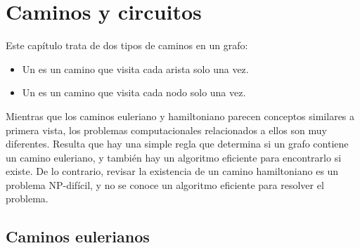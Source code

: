 \chapter{Caminos y circuitos}

Este capítulo trata de dos tipos de caminos en un grafo:
\begin{itemize}
    \item Un  es un camino que visita cada arista
          solo una vez.
    \item Un  es un camino que visita cada nodo
          solo una vez.
\end{itemize}

Mientras que los caminos euleriano y hamiltoniano parecen conceptos
similares a primera vista, los problemas computacionales relacionados
a ellos son muy diferentes. Resulta que hay una simple regla que
determina si un grafo contiene un camino euleriano, y también hay un
algoritmo eficiente para encontrarlo si existe. De lo contrario,
revisar la existencia de un camino hamiltoniano es un problema NP-difícil,
y no se conoce un algoritmo eficiente para resolver el problema.

\section{Caminos eulerianos}


